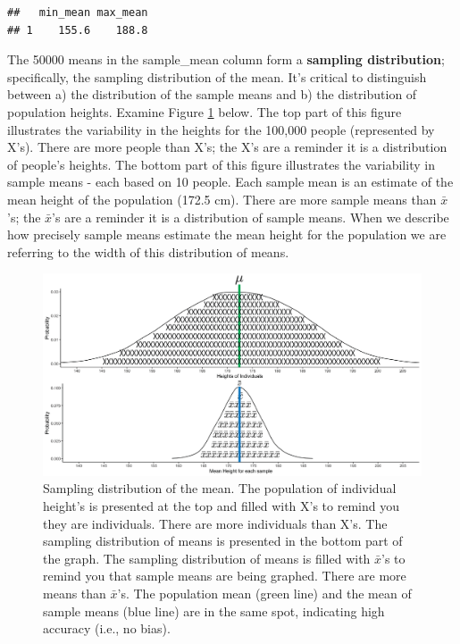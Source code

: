 \documentclass[
]{krantz}
\begin{document}
\begin{verbatim}
##   min_mean max_mean
## 1    155.6    188.8
\end{verbatim}

The 50000 means in the sample\_mean column form a \textbf{sampling distribution}; specifically, the sampling distribution of the mean. It's critical to distinguish between a) the distribution of the sample means and b) the distribution of population heights. Examine Figure \ref{fig:bothdist2} below. The top part of this figure illustrates the variability in the heights for the 100,000 people (represented by X's). There are more people than X's; the X's are a reminder it is a distribution of people's heights. The bottom part of this figure illustrates the variability in sample means - each based on 10 people. Each sample mean is an estimate of the mean height of the population (172.5 cm). There are more sample means than \(\bar{x}\)'s; the \(\bar{x}\)'s are a reminder it is a distribution of sample means. When we describe how precisely sample means estimate the mean height for the population we are referring to the width of this distribution of means.

\begin{figure}
\includegraphics[width=0.8\linewidth]{ch_samples_precision/images/sampling_dist} \caption[Sampling distribution of the mean.]{Sampling distribution of the mean. The population of individual height's is presented at the top and filled with X's to remind you they are individuals. There are more individuals than X's. The sampling distribution of means is presented in the bottom part of the graph. The sampling distribution of means is filled with $\bar{x}$'s to remind you that sample means are being graphed. There are more means than $\bar{x}$'s. The population mean (green line) and the mean of sample means (blue line) are in the same spot, indicating high accuracy (i.e., no bias).}\label{fig:bothdist2}
\end{figure}
\end{document}

